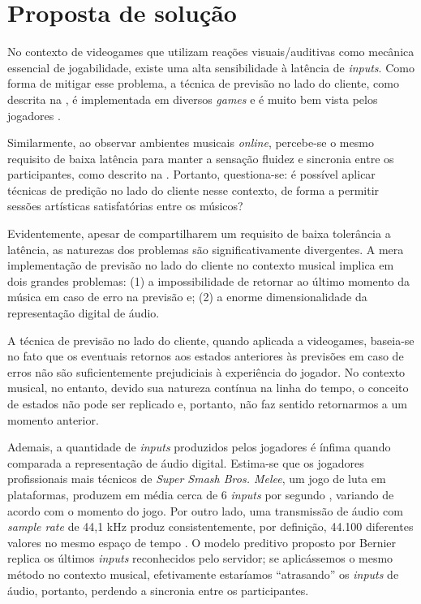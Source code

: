 \chapter{Proposta de solução}
\label{chap:solution_propositon}

No contexto de videogames que utilizam reações visuais/auditivas como mecânica essencial de jogabilidade, existe uma alta sensibilidade à latência de \textit{inputs}. Como forma de mitigar esse problema, a técnica de previsão no lado do cliente, como descrita na , é implementada em diversos \textit{games} e é muito bem vista pelos jogadores \cite{rollback_success}.

Similarmente, ao observar ambientes musicais \textit{online}, percebe-se o mesmo requisito de baixa latência para manter a sensação fluidez e sincronia entre os participantes, como descrito na . Portanto, questiona-se: é possível aplicar técnicas de predição no lado do cliente nesse contexto, de forma a permitir sessões artísticas satisfatórias entre os músicos?

Evidentemente, apesar de compartilharem um requisito de baixa tolerância a latência, as naturezas dos problemas são significativamente divergentes. A mera implementação de previsão no lado do cliente no contexto musical implica em dois grandes problemas: (1) a impossibilidade de retornar ao último momento da música em caso de erro na previsão e; (2) a enorme dimensionalidade da representação digital de áudio.

A técnica de previsão no lado do cliente, quando aplicada a videogames, baseia-se no fato que os eventuais retornos aos estados anteriores às previsões em caso de erros não são suficientemente prejudiciais à experiência do jogador. No contexto musical, no entanto, devido sua natureza contínua na linha do tempo, o conceito de estados não pode ser replicado e, portanto, não faz sentido retornarmos a um momento anterior.
 
Ademais, a quantidade de \textit{inputs} produzidos pelos jogadores é ínfima quando comparada a representação de áudio digital. Estima-se que os jogadores profissionais mais técnicos de \textit{Super Smash Bros. Melee}, um jogo de luta em plataformas, produzem em média cerca de 6 \textit{inputs} por segundo \cite{melee_inputs_per_second}, variando de acordo com o momento do jogo. Por outro lado, uma transmissão de áudio com \textit{sample rate} de 44,1 kHz produz consistentemente, por definição, 44.100 diferentes valores no mesmo espaço de tempo \cite{jukebox_dimension}. O modelo preditivo proposto por Bernier \cite{client-side-prediction} replica os últimos \textit{inputs} reconhecidos pelo servidor; se aplicássemos o mesmo método no contexto musical, efetivamente estaríamos ``atrasando'' os \textit{inputs} de áudio, portanto, perdendo a sincronia entre os participantes.

